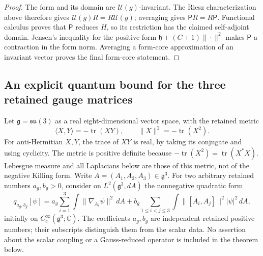 \begin{proof}
The form and its domain are \(\mathcal U(g)\)-invariant.
The Riesz characterization above therefore gives
\(\mathcal U(g)R=R\mathcal U(g)\); averaging gives
\(\mathsf PR=R\mathsf P\). Functional calculus proves that
\(\mathsf P\) reduces \(H\), so its restriction has the claimed
self-adjoint domain. Jensen's inequality for the positive form
\(\mathfrak h+(C+1)\|\cdot\|^2\) makes \(\mathsf P\) a contraction
in the form norm. Averaging a form-core approximation of an
invariant vector proves the final form-core statement.
\end{proof}

\subsection*{An explicit quantum bound for the three retained gauge matrices}

Let $\mathfrak g=\mathfrak{su}(3)$ as a real eight-dimensional vector
space, with the retained metric
\[
 \langle X,Y\rangle=-\operatorname{tr}(XY),\qquad
 \|X\|^2=-\operatorname{tr}(X^2).
\]
For anti-Hermitian $X,Y$, the trace of $XY$ is real, by taking its
conjugate and using cyclicity. The metric is positive definite because
$-\operatorname{tr}(X^2)=\operatorname{tr}(X^*X)$.
Lebesgue measure and all Laplacians below are those of this metric,
not of the negative Killing form. Write $A=(A_1,A_2,A_3)\in\mathfrak g^3$.
For two arbitrary retained numbers $a_g,b_g>0$, consider on
$L^2(\mathfrak g^3,dA)$ the nonnegative quadratic form
\[
 q_{a_g,b_g}[\psi]=
 a_g\sum_{i=1}^3\int\|\nabla_{A_i}\psi\|^2\,dA+
 b_g\sum_{1\leq i<j\leq3}
       \int\|[A_i,A_j]\|^2|\psi|^2\,dA,                       \tag{MQ.1}
\]
initially on $C_c^\infty(\mathfrak g^3;\mathbb C)$.
The coefficients $a_g,b_g$ are independent retained positive numbers;
their subscripts distinguish them from the scalar data. No assertion about the scalar
coupling or a Gauss-reduced operator is included in the theorem below.

